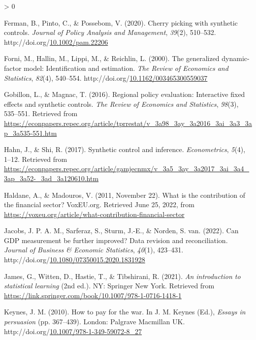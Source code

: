 \documentclass[12pt,nobind, a4paper]{reedthesis}
\newlength{\cslhangindent}
\newenvironment{CSLReferences}[2] %
{%
	\setlength{\parindent}{0pt}
	\ifodd #1 \everypar{\setlength{\hangindent}{\cslhangindent}}\ignorespaces\fi
	\ifnum #2 > 0
	\setlength{\parskip}{#2\baselineskip}
	\fi
}%
{}
\begin{document}
\begin{CSLReferences}{1}{0}
 \leavevmode\hypertarget{ref-ferman_cherry_2020}{}%
 Ferman, B., Pinto, C., \& Possebom, V. (2020). Cherry picking with synthetic controls. \emph{Journal of Policy Analysis and Management}, \emph{39}(2), 510--532. http://doi.org/\href{https://doi.org/10.1002/pam.22206}{10.1002/pam.22206}

 \leavevmode\hypertarget{ref-forni_generalized_2000}{}%
 Forni, M., Hallin, M., Lippi, M., \& Reichlin, L. (2000). The generalized dynamic-factor model: Identification and estimation. \emph{The Review of Economics and Statistics}, \emph{82}(4), 540--554. http://doi.org/\href{https://doi.org/10.1162/003465300559037}{10.1162/003465300559037}

 \leavevmode\hypertarget{ref-gobillon_regional_2016}{}%
 Gobillon, L., \& Magnac, T. (2016). Regional policy evaluation: Interactive fixed effects and synthetic controls. \emph{The Review of Economics and Statistics}, \emph{98}(3), 535--551. Retrieved from \url{https://econpapers.repec.org/article/tprrestat/v_3a98_3ay_3a2016_3ai_3a3_3ap_3a535-551.htm}

 \leavevmode\hypertarget{ref-hahn_synthetic_2017}{}%
 Hahn, J., \& Shi, R. (2017). Synthetic control and inference. \emph{Econometrics}, \emph{5}(4), 1--12. Retrieved from \url{https://econpapers.repec.org/article/gamjecnmx/v_3a5_3ay_3a2017_3ai_3a4_3ap_3a52-_3ad_3a120610.htm}

 \leavevmode\hypertarget{ref-haldane_what_2011}{}%
 Haldane, A., \& Madouros, V. (2011, November 22). What is the contribution of the financial sector? {VoxEU}.org. Retrieved June 25, 2022, from \url{https://voxeu.org/article/what-contribution-financial-sector}

 \leavevmode\hypertarget{ref-jacobs_can_2022}{}%
 Jacobs, J. P. A. M., Sarferaz, S., Sturm, J.-E., \& Norden, S. van. (2022). Can {GDP} measurement be further improved? Data revision and reconciliation. \emph{Journal of Business \& Economic Statistics}, \emph{40}(1), 423--431. http://doi.org/\href{https://doi.org/10.1080/07350015.2020.1831928}{10.1080/07350015.2020.1831928}

 \leavevmode\hypertarget{ref-james_introduction_2021}{}%
 James, G., Witten, D., Hastie, T., \& Tibshirani, R. (2021). \emph{An introduction to statistical learning} (2nd ed.). {NY}: Springer New York. Retrieved from \url{https://link.springer.com/book/10.1007/978-1-0716-1418-1}

 \leavevmode\hypertarget{ref-keynes_how_2010}{}%
 Keynes, J. M. (2010). How to pay for the war. In J. M. Keynes (Ed.), \emph{Essays in persuasion} (pp. 367--439). London: Palgrave Macmillan {UK}. http://doi.org/\href{https://doi.org/10.1007/978-1-349-59072-8_27}{10.1007/978-1-349-59072-8\_27}


\end{CSLReferences}
\end{document}
